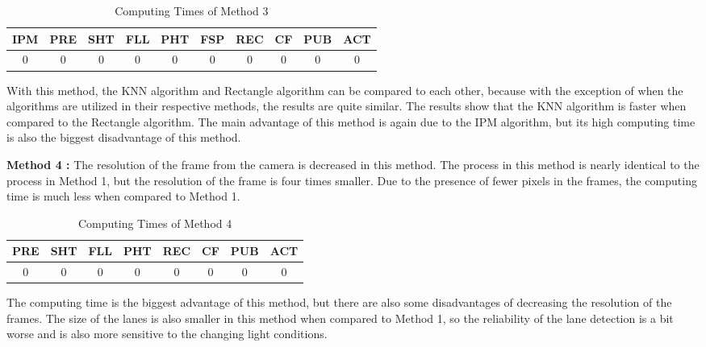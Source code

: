 \begin{table}[ht]
\caption{Computing Times of Method 3} 
\centering 
  \begin{tabular}{ | c | c | c | c | c | c | c | c | c | c |}
    \hline
  
  IPM 		& PRE 		& SHT	   & FLL 	   & PHT 	   & FSP 	    & REC 	   & CF 	  & PUB 	& ACT \\ \hline  
  0 & 0 & 0 & 0 & 0 & 0 & 0 & 0 & 0       & 0   \\ \hline  
    
    
      \end{tabular}
  \label{tab:Case3_Times}
\end{table}

With this method, the KNN algorithm and Rectangle algorithm can be compared to each other, because with the exception of when the algorithms are utilized in their respective methods, the results are quite similar. The results show that the KNN algorithm is faster when compared to the Rectangle algorithm. The main advantage of this method is again due to the IPM algorithm, but its high computing time is also the biggest disadvantage of this method.

\textbf{Method 4 : }The resolution of the frame from the camera is decreased in this method. The
process in this method is nearly identical to the process in Method 1, but the resolution of the frame is four times smaller. Due to the presence of fewer pixels in the frames, the computing time is much less when compared to Method 1.



\begin{table}[ht]
\caption{Computing Times of Method 4} 
\centering 
  \begin{tabular}{ | c | c | c | c | c | c | c | c |}
    \hline
  
  PRE & SHT & FLL & PHT & REC & CF & PUB & ACT \\ \hline  
  0   &  0  &  0  &  0  &  0  &  0 &  0  &  0 \\ \hline  
    
    
      \end{tabular}
  \label{tab:Case4_Times}
\end{table}

The computing time is the biggest advantage of this method, but there are also some disadvantages of decreasing the resolution of the frames. The size of the lanes is also smaller in this method when compared to Method 1, so the reliability of the lane detection is a bit worse and is also more sensitive to the changing light conditions.


